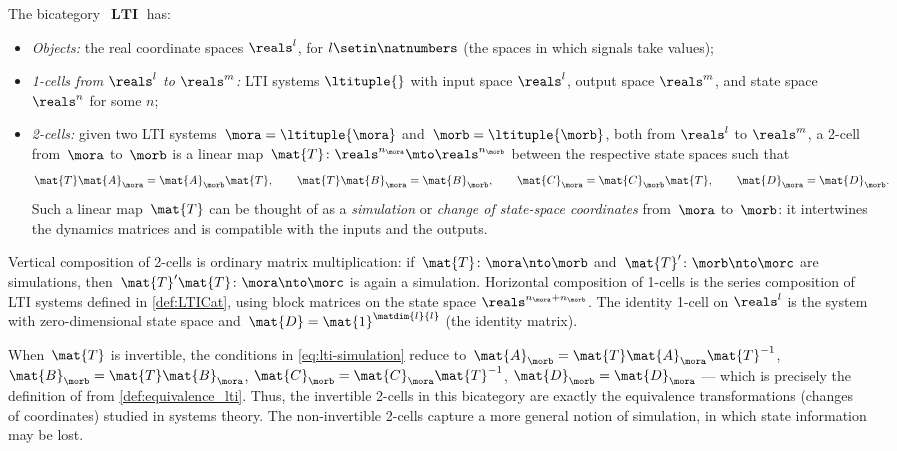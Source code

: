 \begin{example}
    The bicategory~$\operatorname{\textbf{LTI}}$ has:
    \begin{itemize}
        \item \emph{Objects:} the real coordinate spaces $\reals^l$, for $l \setin \natnumbers$ (the spaces in which signals take values);
        \item \emph{1-cells from $\reals^l$ to $\reals^m$:} LTI systems $\ltituple{}$ with input space $\reals^l$, output space $\reals^m$, and state space $\reals^n$ for some $n$;
        \item \emph{2-cells:} given two LTI systems~$\mora = \ltituple{\mora}$ and~$\morb = \ltituple{\morb}$, both from $\reals^l$ to $\reals^m$, a 2-cell from~$\mora$ to~$\morb$ is a linear map~$\mat{T} \colon \reals^{n_\mora} \mto \reals^{n_\morb}$ between the respective state spaces such that
              \begin{equation}\label{eq:lti-simulation}
                  \mat{T}\mat{A}_\mora = \mat{A}_\morb\mat{T}, \qquad \mat{T}\mat{B}_\mora = \mat{B}_\morb, \qquad \mat{C}_\mora = \mat{C}_\morb\mat{T}, \qquad \mat{D}_\mora = \mat{D}_\morb.
              \end{equation}
              Such a linear map~$\mat{T}$ can be thought of as a \emph{simulation} or \emph{change of state-space coordinates} from~$\mora$ to~$\morb$: it intertwines the dynamics matrices and is compatible with the inputs and the outputs.
    \end{itemize}
    Vertical composition of 2-cells is ordinary matrix multiplication: if~$\mat{T} \colon \mora \nto \morb$ and~$\mat{T}' \colon \morb \nto \morc$ are simulations, then~$\mat{T}' \mat{T} \colon \mora \nto \morc$ is again a simulation.
    Horizontal composition of 1-cells is the series composition of LTI systems defined in \cref{def:LTICat}, using block matrices on the state space $\reals^{n_\mora + n_\morb}$.
    The identity 1-cell on $\reals^l$ is the system with zero-dimensional state space and~$\mat{D} = \mat{1}^{\matdim{l}{l}}$ (the identity matrix).

    When~$\mat{T}$ is invertible, the conditions in \cref{eq:lti-simulation} reduce to~$\mat{A}_\morb = \mat{T}\mat{A}_\mora\mat{T}^{-1}$, $\mat{B}_\morb = \mat{T}\mat{B}_\mora$, $\mat{C}_\morb = \mat{C}_\mora\mat{T}^{-1}$, $\mat{D}_\morb = \mat{D}_\mora$ --- which is precisely the definition of  from \cref{def:equivalence_lti}.
    Thus, the invertible 2-cells in this bicategory are exactly the equivalence transformations (changes of coordinates) studied in systems theory.
    The non-invertible 2-cells capture a more general notion of simulation, in which state information may be lost.
\end{example}

